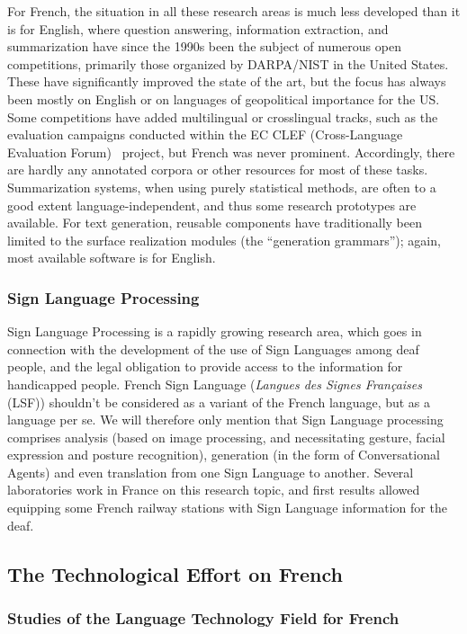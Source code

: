 \begin{multicols}{2}
For French, the situation in all these research areas is much less
developed than it is for English, where question answering,
information extraction, and summarization have since the 1990s been
the subject of numerous open competitions, primarily those organized
by DARPA/NIST in the United States. These have significantly improved
the state of the art, but the focus has always been mostly on English
or on languages of geopolitical importance for the US. Some
competitions have added multilingual or crosslingual tracks, such as
the evaluation campaigns conducted within the EC CLEF (Cross-Language
Evaluation Forum)~\cite{clef} project, but French was never
prominent. Accordingly, there are hardly any annotated corpora or
other resources for most of these tasks. Summarization systems, when
using purely statistical methods, are often to a good extent
language-independent, and thus some research prototypes are
available. For text generation, reusable components have traditionally
been limited to the surface realization modules (the ``generation
grammars''); again, most available software is for English.

\subsubsection{Sign Language Processing}

Sign Language Processing is a rapidly growing research area, which
goes in connection with the development of the use of Sign Languages
among deaf people, and the legal obligation to provide access to the
information for handicapped people. French Sign Language ({\em Langues des
Signes Françaises} (LSF)) shouldn't be considered as a variant of the
French language, but as a language per se. We will therefore only
mention that Sign Language processing comprises analysis (based on
image processing, and necessitating gesture, facial expression and
posture recognition), generation (in the form of Conversational
Agents) and even translation from one Sign Language to
another. Several laboratories work in France on this research topic,
and first results allowed equipping some French railway stations with
Sign Language information for the deaf.

\subsection{The Technological Effort on French}

\subsubsection{Studies of the Language Technology Field for French}


\end{multicols}
